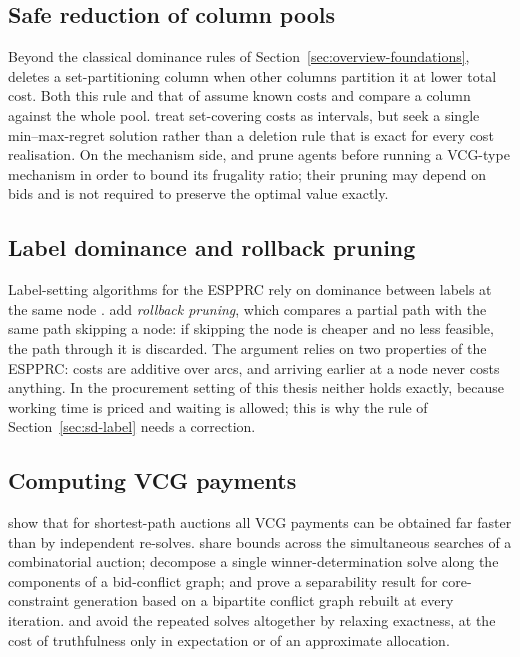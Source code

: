 \subsection{Safe reduction of column pools}

Beyond the classical dominance rules of Section~\ref{sec:overview-foundations},
\citet{muller1998solving} deletes a set-partitioning column when other
columns partition it at lower total cost. Both this rule and that of
\citet{beasley1987algorithm} assume known costs and compare a column against
the whole pool. \citet{pereira2013robust} treat set-covering costs as
intervals, but seek a single min--max-regret solution rather than a
deletion rule that is exact for every cost realisation. On the mechanism
side, \citet{aggarwal2006knapsack} and \citet{kempe2010frugal} prune agents
before running a VCG-type mechanism in order to bound its frugality ratio;
their pruning may depend on bids and is not required to preserve the
optimal value exactly.

\subsection{Label dominance and rollback pruning}

Label-setting algorithms for the ESPPRC rely on dominance between labels at
the same node \citep{feillet2004exact}. \citet{lozano2016exact} add
\emph{rollback pruning}, which compares a partial path with the same path
skipping a node: if skipping the node is cheaper and no less feasible, the
path through it is discarded. The argument relies on two properties of the
ESPPRC: costs are additive over arcs, and arriving earlier at a node never
costs anything. In the procurement setting of this thesis neither holds
exactly, because working time is priced and waiting is allowed; this is why
the rule of Section~\ref{sec:sd-label} needs a correction.

\subsection{Computing VCG payments}

\citet{hershberger2001vickrey} show that for shortest-path auctions all
VCG payments can be obtained far faster than by independent re-solves.
\citet{bleischwitz2005accelerating} share bounds across the simultaneous
searches of a combinatorial auction; \citet{sandholm2005cabob} decompose a
single winner-determination solve along the components of a bid-conflict
graph; and \citet{bunz2015faster} prove a separability result for
core-constraint generation based on a bipartite conflict graph rebuilt at
every iteration. \citet{wilkens2012single} and \citet{li2026auction} avoid
the repeated solves altogether by relaxing exactness, at the cost of
truthfulness only in expectation or of an approximate allocation.

